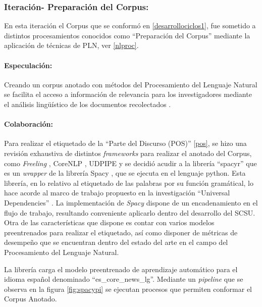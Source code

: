 \documentclass[
  12pt,
  openany]{book}
\begin{document}
\hypertarget{iternlp}{%
\subsubsection{Iteración- Preparación del Corpus:}\label{iternlp}}

En esta iteración el Corpus que se conformó en \ref{desarrollociclos1}, fue sometido a distintos procesamientos conocidos como ``Preparación del Corpus'' mediante la aplicación de técnicas de PLN, ver \ref{nlproc}.

\hypertarget{especulaciuxf3n-4}{%
\paragraph{Especulación:}\label{especulaciuxf3n-4}}

Creando un corpus anotado con métodos del Procesamiento del Lenguaje Natural se facilita el acceso a información de relevancia para los investigadores mediante el análisis lingüístico de los documentos recolectados \citep{article}.

\hypertarget{colaboraciuxf3n-4}{%
\paragraph{Colaboración:}\label{colaboraciuxf3n-4}}

Para realizar el etiquetado de la ``Parte del Discurso (POS)'' \ref{pos}, se hizo una revisión exhaustiva de distintos \emph{frameworks} para realizar el anotado del Corpus, como \emph{Freeling} \citep{padro12}, CoreNLP \citep{manning-etal-2014-stanford}, UDPIPE \citep{udpipe-2} y se decidió acudir a la librería ``spacyr'' \citep{spacyr} que es un \emph{wrapper} de la librería Spacy \citep{spacy2020}, que se ejecuta en el lenguaje python. Esta librería, en lo relativo al etiquetado de las palabras por su función gramátical, lo hace acorde al marco de trabajo propuesto en la investigación ``Universal Dependencies'' \citep{demarneffe2021}. La implementación de \emph{Spacy} dispone de un encadenamiento en el flujo de trabajo, resultando conveniente aplicarlo dentro del desarrollo del SCSU. Otra de las características que dispone es contar con varios modelos preentrenados para realizar el etiquetado, así como disponer de métricas de desempeño que se encuentran dentro del estado del arte en el campo del Procesamiento del Lenguaje Natural.

La librería carga el modelo preentrenado de aprendizaje automático para el idioma español denominado ``es\_core\_news\_lg''. Mediante un \emph{pipeline} que se observa en la figura \ref{fig:spacypi} se ejecutan procesos que permiten conformar el Corpus Anotado.
\end{document}

